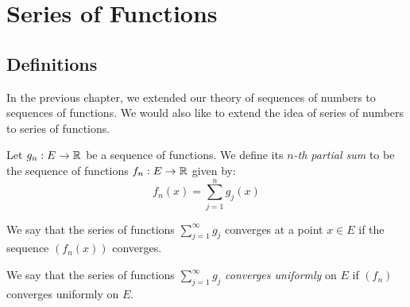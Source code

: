 \documentclass[../main.tex]{subfiles}
\begin{document}
\chapter{Series of Functions}
\section{Definitions}
In the previous chapter, we extended our theory of sequences of numbers to sequences of functions.
We would also like to extend the idea of series of numbers to series of functions.
\begin{definition}
  Let $g_n: E \to \mathbb{R}$ be  a sequence of functions.
  We define its \textit{$n$-th partial sum} to be the sequence of functions $f_n: E \to \mathbb{R}$ given by:
  \[
    f_n(x) = \sum_{j = 1}^{n} g_j(x)
  \]
\end{definition}
\begin{definition}
  We say that the series of functions $\sum_{j = 1}^{\infty} g_j$ converges at a point $x \in E$ if the sequence $(f_n(x))$ converges.
\end{definition}
\begin{definition}
  We say that the series of functions $\sum_{j = 1}^{\infty} g_j$ \textit{converges uniformly} on $E$ if $(f_n)$ converges uniformly on $E$.
\end{definition}
\end{document}
